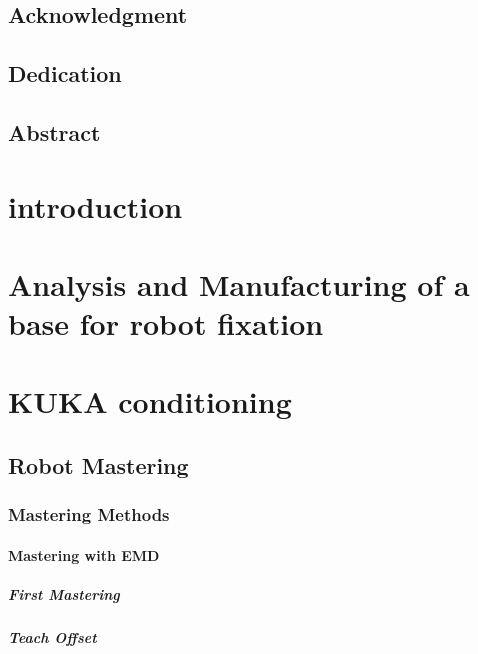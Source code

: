 \documentclass{book}
\begin{document}
   \tableofcontents
   \newpage
   \section{Acknowledgment}
   \newpage
   \section{Dedication}
   \newpage
   \section{Abstract}
   
   \listoffigures
   \listoftables
   

   

	\chapter{introduction}
	
	\chapter{Analysis and Manufacturing of a base for robot fixation}
	\section{}
	
	
	
	\chapter{KUKA conditioning}
		\section{Robot Mastering}
			\subsection{Mastering Methods}
			\subsubsection{Mastering with EMD}
				\paragraph{First Mastering}
				\paragraph{Teach Offset}
\end{document}
